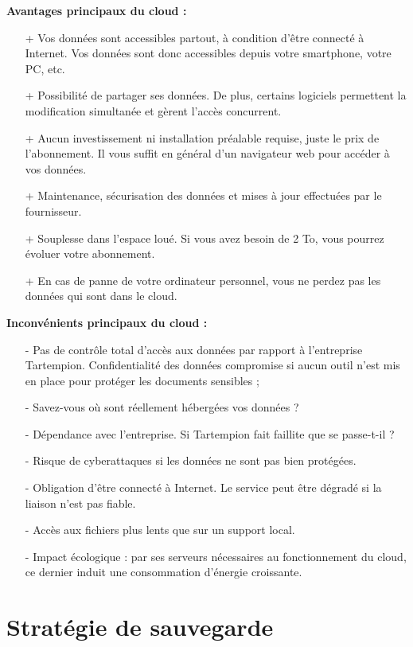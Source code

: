 \documentclass[11pt, a4paper]{book}
\begin{document}
\textbf{Avantages principaux du cloud :}
\begin{enumerate}
\item[+] Vos données sont accessibles partout, à condition d’être connecté à Internet. Vos données sont donc accessibles depuis votre smartphone, votre PC, etc.
\item[+] Possibilité de partager ses données. De plus, certains logiciels permettent la modification simultanée et gèrent l’accès concurrent.
\item[+] Aucun investissement ni installation préalable requise, juste le prix de l’abonnement. Il vous suffit en général d’un navigateur web pour accéder à vos données.
\item[+] Maintenance, sécurisation des données et mises à jour effectuées par le fournisseur.
\item[+] Souplesse dans l’espace loué. Si vous avez besoin de 2 To, vous pourrez évoluer votre abonnement.
\item[+] En cas de panne de votre ordinateur personnel, vous ne perdez pas les données qui sont dans le cloud.
\end{enumerate}
\textbf{Inconvénients principaux du cloud :}
\begin{enumerate}
\item[-] Pas de contrôle total d’accès aux données par rapport à l’entreprise Tartempion. Confidentialité des données compromise si aucun outil n’est mis en place pour protéger les documents sensibles ;
\item[-] Savez-vous où sont réellement hébergées vos données ?
\item[-] Dépendance avec l’entreprise. Si Tartempion fait faillite que se passe-t-il ?
\item[-] Risque de cyberattaques si les données ne sont pas bien protégées.
\item[-] Obligation d’être connecté à Internet. Le service peut être dégradé si la liaison n’est pas fiable.
\item[-] Accès aux fichiers plus lents que sur un support local.
\item[-] Impact écologique : par ses serveurs nécessaires au fonctionnement du cloud, ce dernier induit une consommation d’énergie croissante.

\end{enumerate}

\section{Stratégie de sauvegarde}
\end{document}
